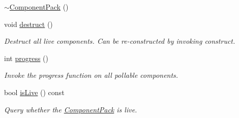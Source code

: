 \begin{DoxyCompactItemize}
$$\hyperlink{structvt_1_1runtime_1_1component_1_1_component_pack_ad850ada38f5f4397fa414885a545fdaf}{$\sim$\+Component\+Pack} ()
\item 
void \hyperlink{structvt_1_1runtime_1_1component_1_1_component_pack_a1821ae6fbe03896a3a4a61bf44a5d38b}{destruct} ()
\begin{DoxyCompactList}\small\item\em Destruct all live components. Can be re-\/constructed by invoking {\ttfamily construct}. \end{DoxyCompactList}\item 
int \hyperlink{structvt_1_1runtime_1_1component_1_1_component_pack_a38f85e6b4417904ea404c03fc167f5a7}{progress} ()
\begin{DoxyCompactList}\small\item\em Invoke the progress function on all pollable components. \end{DoxyCompactList}\item 
bool \hyperlink{structvt_1_1runtime_1_1component_1_1_component_pack_a67db159a0ceb87496df4dd40ce9d44b4}{is\+Live} () const
\begin{DoxyCompactList}\small\item\em Query whether the {\ttfamily \hyperlink{structvt_1_1runtime_1_1component_1_1_component_pack}{Component\+Pack}} is live. \end{DoxyCompactList}\end{DoxyCompactItemize}
